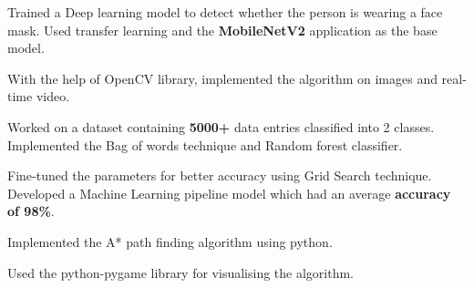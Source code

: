 \documentclass[]{deedy-resume-reversed}
\begin{document}
\begin{minipage}[t]{0.59\textwidth}
\begin{tightemize}
\large{\item Trained a Deep learning model to detect whether the person is wearing a face mask. Used transfer learning and the \textbf{MobileNetV2} application as the base model. \item With the help of OpenCV library, implemented the algorithm on images and real-time video.}
\end{tightemize}
\sectionsep

\begin{tightemize}
\large{\item Worked on a dataset containing \textbf{5000+} data entries classified into 2 classes. Implemented the Bag of words technique and Random forest classifier. \item Fine-tuned the parameters for better accuracy using Grid Search technique. Developed a Machine Learning pipeline model which had an average \textbf{accuracy of 98\%}.}
\end{tightemize}
\sectionsep

\begin{tightemize}
\large{\item Implemented the A* path finding algorithm using python. 
\item Used the python-pygame library for visualising the algorithm.}
\end{tightemize}
\sectionsep




\end{minipage}
\end{document}
